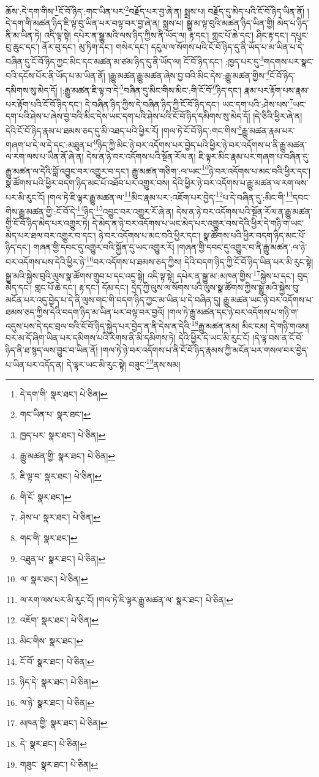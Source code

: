 ཆོས་:དེ་དག་གིས་\footnote{དེ་དག་གི་  སྣར་ཐང་།  པེ་ཅིན། }ངོ་བོ་ཉིད་:གང་ཡིན་པར་\footnote{གང་ཡིན་པ་  སྣར་ཐང་། }བརྗོད་པར་བྱ་ཞེ་ན། སྨྲས་པ། བརྗོད་དུ་མེད་པའི་ངོ་བོ་ཉིད་ཡིན་ནོ། །དེ་དག་གི་མཚན་ཉིད་ཇི་ལྟ་བུ་ཡིན་པར་བལྟ་བར་བྱ་ཞེ་ན། སྨྲས་པ། སྒྱུ་མ་ལྟ་བུའི་མཚན་ཉིད་ཡིན་གྱི། མེད་པ་ཉིད་ནི་མ་ཡིན་ཏེ། འདི་ལྟ་སྟེ། དཔེར་ན་སྒྱུ་མའི་ལས་ཉིད་ཀྱིས་ནི་ཡོད་ལ། རྟ་དང་། གླང་པོ་ཆེ་དང་། ཤིང་རྟ་དང་། དཔུང་བུ་ཆུང་དང་། ནོར་བུ་དང་། མུ་ཏིག་དང་། གསེར་དང་། དངུལ་ལ་སོགས་པའི་ངོ་བོ་ཉིད་དུ་ནི་ཡོད་པ་མ་ཡིན་པ་དེ་བཞིན་དུ་ངོ་བོ་ཉིད་ཀྱང་མིང་དང་མཚན་མ་ཙམ་ཉིད་དུ་ནི་ཡོད་ལ། ངོ་བོ་ཉིད་དང་། :ཁྱད་པར་དུ་\footnote{ཁྱད་པར་  སྣར་ཐང་།  པེ་ཅིན། }གདགས་པར་སྣང་བའི་དངོས་པོར་ནི་ཡོད་པ་མ་ཡིན་ནོ། །རྒྱུ་མཚན་རྒྱུ་མཚན་ཞེས་བྱ་བའི་མིང་དེས་:རྒྱུ་མཚན་གྱིས་\footnote{རྒྱུ་མཚན་གྱི་  སྣར་ཐང་།  པེ་ཅིན། }ངོ་བོ་ཉིད་དམིགས་སུ་མེད་དོ། །:རྒྱུ་མཚན་ཇི་ལྟ་བ་དེ་\footnote{ཇི་ལྟ་བ་  སྣར་ཐང་།  པེ་ཅིན། }བཞིན་དུ་མིང་གིས་མིང་:གི་ངོ་བོ་\footnote{གི་ངོ་  སྣར་ཐང་། }ཉིད་དང་། རྣམ་པར་རྟོག་པས་རྣམ་པར་རྟོག་པའི་ངོ་བོ་ཉིད་དང་། དེ་བཞིན་ཉིད་ཀྱིས་དེ་བཞིན་ཉིད་ཀྱི་ངོ་བོ་ཉིད་དང་། ཡང་དག་པའི་:ཤེས་པས་\footnote{ཤེས་པ་  སྣར་ཐང་།  པེ་ཅིན། }ཡང་དག་པའི་ཤེས་པ་ཞེས་བྱ་བའི་མིང་དེས་ཡང་དག་པའི་ཤེས་པའི་ངོ་བོ་ཉིད་དམིགས་སུ་མེད་དོ། །དེ་ཅིའི་ཕྱིར་ཞེ་ན། དེའི་ངོ་བོ་ཉིད་རྣམ་པ་ཐམས་ཅད་དུ་མི་འཐད་པའི་ཕྱིར་རོ། །གལ་ཏེ་ངོ་བོ་ཉིད་:གང་གིས་\footnote{གང་གི་  སྣར་ཐང་། }རྒྱུ་མཚན་རྣམ་པར་གཞག་པ་དེ་ལ་དེ་དང་:མཐུན་པ་\footnote{འཐུན་པ་  སྣར་ཐང་།  པེ་ཅིན། }ཉིད་ཀྱི་མིང་ཉེ་བར་འདོགས་པར་བྱེད་པའི་ཕྱིར་ཉེ་བར་འདོགས་པ་ནི་རྒྱུ་མཚན་ལ་རག་ལས་པ་ཡིན་ནོ་ཞེ་ན། དེས་ན་ཉེ་བར་འདོགས་པའི་སྔོན་རོལ་ན། ཇི་ལྟར་མིང་རྣམ་པར་གཞག་པ་བཞིན་དུ་རྒྱུ་མཚན་ལ་དེའི་བློ་འབྱུང་བར་འགྱུར་བ་དང་། རྒྱུ་མཚན་གཅིག་:ལ་ཡང་\footnote{ལ་  སྣར་ཐང་།  པེ་ཅིན། }ཉེ་བར་འདོགས་པ་མང་བའི་ཕྱིར་དང་། སྣ་ཚོགས་པའི་ཕྱིར་བདག་ཉིད་མང་པོ་འཐོབ་པར་འགྱུར་བས། དེའི་ཕྱིར་ཉེ་བར་འདོགས་པ་རྒྱུ་མཚན་ལ་རག་ལས་པར་མི་རུང་ངོ། །གལ་ཏེ་ཇི་ལྟར་རྒྱུ་མཚན་ལ་\footnote{ལ་རག་ལས་པར་མི་རུང་ངོ། །གལ་ཏེ་ཇི་ལྟར་རྒྱུ་མཚན་ལ་  སྣར་ཐང་།  པེ་ཅིན། }མིང་རྣམ་པར་:འཇོག་པར་བྱེད་\footnote{འཇོག་  སྣར་ཐང་།  པེ་ཅིན། }པ་དེ་བཞིན་དུ་:མིང་གི་\footnote{མིང་གིས་  སྣར་ཐང་། }དབང་གིས་རྒྱུ་མཚན་གྱི་:ངོ་བོ་དེ་\footnote{ངོ་བོ་  སྣར་ཐང་།  པེ་ཅིན། }ཉིད་\footnote{ཉིད་དེ་  སྣར་ཐང་།  པེ་ཅིན། }འབྱུང་བར་འགྱུར་རོ་ཞེ་ན། དེས་ན་ཉེ་བར་འདོགས་པའི་སྔོན་རོལ་ན་རྒྱུ་མཚན་གྱི་ངོ་བོ་ཉིད་མེད་པར་འགྱུར་ཏེ། དེ་མེད་ན་ཉེ་བར་འདོགས་པ་ཡང་མེད་པར་འགྱུར་བས་དེའི་ཕྱིར་དེ་གཉི་ག་ཡང་མེད་པར་ཐལ་བར་འགྱུར་བ་དང་། ཉེ་བར་འདོགས་པ་མང་བའི་ཕྱིར་དང་། སྣ་ཚོགས་པའི་ཕྱིར་བདག་ཉིད་མང་པོ་ཉིད་དང་། གཞན་གྱི་དབང་དུ་འགྱུར་བའི་སྐྱོན་དུ་ཡང་འགྱུར་རོ། །གཞན་གྱི་དབང་དུ་འགྱུར་བ་ནི་རྒྱུ་མཚན་:ལ་ཉེ་བར་འདོགས་པས་དེའི་ཕྱིར་ཉེ་\footnote{ལ་ཉེ་  སྣར་ཐང་།  པེ་ཅིན། }བར་འདོགས་པ་ཐམས་ཅད་ཀྱིས། དེའི་བདག་ཉིད་ཀྱི་ངོ་བོ་ཉིད་ཡིན་པར་མི་རུང་སྟེ། སྒྱུ་མའི་སྐྱེས་བུའི་ལུས་སྣ་ཚོགས་གྲུབ་པ་དང་འདྲ་སྟེ། འདི་ལྟ་སྟེ། དཔེར་ན་སྒྱུ་མ་:མཁན་གྱིས་\footnote{མཁན་གྱི་  སྣར་ཐང་།  པེ་ཅིན། }སྐྱེས་པ་དང་། བུད་མེད་དང་། གླང་པོ་ཆེ་དང་། རྟ་དང་། དོམ་དང་། དྲེད་ཀྱི་ལུས་ལ་སོགས་པའི་ལུས་སྣ་ཚོགས་ཀྱིས་སྒྱུ་མའི་སྐྱེས་བུ་མངོན་པར་འདུ་བྱེད་པ་དེ་ནི་ལུས་གང་གི་བདག་ཉིད་ཀྱང་མ་ཡིན་པ་དེ་བཞིན་དུ། རྒྱུ་མཚན་ཡང་ཉེ་བར་འདོགས་པ་ཐམས་ཅད་ཀྱིས་དེའི་བདག་ཉིད་མ་ཡིན་པར་བལྟ་བར་བྱའོ། །གལ་ཏེ་རྒྱུ་མཚན་དང་ཉེ་བར་འདོགས་པ་གཉི་ག་འདུས་པས་དེ་དང་བྲལ་བའི་ངོ་བོ་ཉིད་སྐྱེད་པར་བྱེད་ན་ནི་དེས་ན་དེའི་\footnote{དེ་  སྣར་ཐང་།  པེ་ཅིན། }རྒྱུ་མཚན་ནམ། མིང་ངམ། དེ་གཉི་གའམ། བར་མ་དོ་ཞིག་ཡིན་པར་དམིགས་པའི་རིགས་ནི་མི་དམིགས་ཏེ། དེའི་ཕྱིར་དེ་ཡང་མི་རུང་ངོ། །དེ་ལྟ་བས་ན་ངོ་བོ་ཉིད་ནི་ཐ་སྙད་ལས་བྱུང་བ་ཡིན་ནོ། །གལ་ཏེ་ཉེ་བར་འདོགས་པ་ནི་ངོ་བོ་ཉིད་རྣམས་ཀྱི་མངོན་པར་གསལ་བར་བྱེད་པ་ཡིན་པར་འདོད་ན། དེ་ལྟར་ཡང་མི་རུང་སྟེ། བཟུང་\footnote{གཟུང་  སྣར་ཐང་།  པེ་ཅིན། }ནས་སམ། 